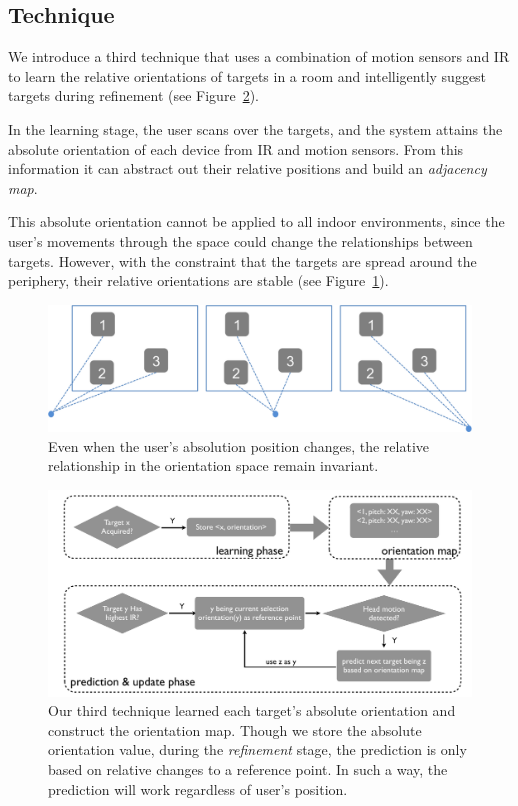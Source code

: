 \subsection{Technique}

We introduce a third technique that uses a combination of motion sensors and IR to learn the relative orientations of
targets in a room and intelligently suggest targets during refinement (see
Figure~\ref{fig:third_technique}).

In the learning stage, the user scans over the targets, and the
system attains the absolute orientation of each device from IR and motion sensors. From this information it can abstract out their relative positions and build an {\em adjacency map}.

This absolute orientation cannot be applied to all indoor
environments, since the user’s movements through the space could change the relationships between targets. However, with the constraint that the targets are spread around the periphery, their relative orientations are stable
(see Figure~\ref{fig:third_principle}). 

\begin{figure}[t]
\centering
\includegraphics[width=1\columnwidth]{figures/third_principle.png}
\caption{Even when the user's absolution position changes, the relative relationship in the orientation space remain invariant.}
\label{fig:third_principle}
\end{figure}

\begin{figure}[t]
\centering
\includegraphics[width=1\columnwidth]{figures/third_technique3.pdf}
\caption{ Our third technique learned each target's absolute orientation and construct the orientation map. Though we store the absolute orientation value, during the {\em refinement} stage, the prediction is only based on relative changes to a reference point. In such a way, the prediction will work regardless of user's position.}
\label{fig:third_technique}
\end{figure}

